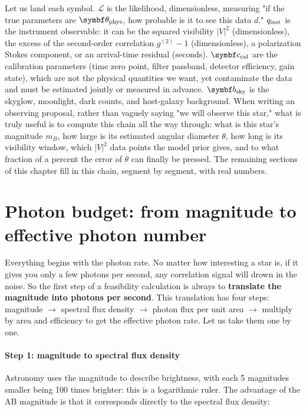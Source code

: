Let us land each symbol. $\mathcal L$ is the likelihood, dimensionless, measuring "if the true parameters are $\bm\theta_{\rm phys}$, how probable is it to see this data $d$." $q_{\rm inst}$ is the instrument observable: it can be the squared visibility $|V|^2$ (dimensionless), the excess of the second-order correlation $g^{(2)}-1$ (dimensionless), a polarization Stokes component, or an arrival-time residual (seconds). $\bm c_{\rm cal}$ are the calibration parameters (time zero point, filter passband, detector efficiency, gain state), which are not the physical quantities we want, yet contaminate the data and must be estimated jointly or measured in advance. $\bm b_{\rm sky}$ is the skyglow, moonlight, dark counts, and host-galaxy background. When writing an observing proposal, rather than vaguely saying "we will observe this star," what is truly useful is to compute this chain all the way through: what is this star's magnitude $m_B$, how large is its estimated angular diameter $\theta$, how long is its visibility window, which $|V|^2$ data points the model prior gives, and to what fraction of a percent the error of $\theta$ can finally be pressed. The remaining sections of this chapter fill in this chain, segment by segment, with real numbers.

\section{Photon budget: from magnitude to effective photon number}
\label{sec:e15-photon-budget}

Everything begins with the photon rate. No matter how interesting a star is, if it gives you only a few photons per second, any correlation signal will drown in the noise. So the first step of a feasibility calculation is always to \textbf{translate the magnitude into photons per second}. This translation has four steps: magnitude $\to$ spectral flux density $\to$ photon flux per unit area $\to$ multiply by area and efficiency to get the effective photon rate. Let us take them one by one.

\paragraph{Step 1: magnitude to spectral flux density}

Astronomy uses the magnitude to describe brightness, with each 5 magnitudes smaller being 100 times brighter: this is a logarithmic ruler. The advantage of the AB magnitude is that it corresponds directly to the spectral flux density:

